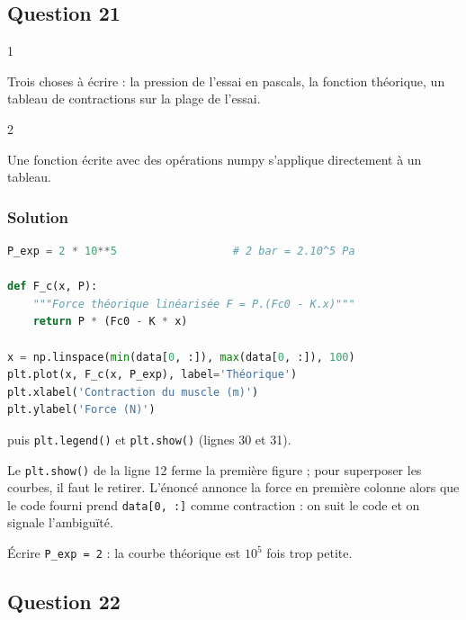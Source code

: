 \documentclass[11pt,a4paper]{article}
\begin{document}
\hypertarget{question-21}{%
\subsection{Question 21}\label{question-21}}

\begin{indication}{1}

Trois choses à écrire : la pression de l'essai en pascals, la fonction théorique, un tableau de contractions sur la plage de l'essai.

\end{indication}

\begin{indication}{2}

Une fonction écrite avec des opérations numpy s'applique directement à un tableau.

\end{indication}

\hypertarget{solution-20}{%
\subsubsection{Solution}\label{solution-20}}

\begin{lstlisting}[language=Python]
P_exp = 2 * 10**5                  # 2 bar = 2.10^5 Pa

def F_c(x, P):
    """Force théorique linéarisée F = P.(Fc0 - K.x)"""
    return P * (Fc0 - K * x)

x = np.linspace(min(data[0, :]), max(data[0, :]), 100)
plt.plot(x, F_c(x, P_exp), label='Théorique')
plt.xlabel('Contraction du muscle (m)')
plt.ylabel('Force (N)')
\end{lstlisting}

puis \texttt{plt.legend()} et \texttt{plt.show()} (lignes 30 et 31).

Le \texttt{plt.show()} de la ligne 12 ferme la première figure ; pour superposer les courbes, il faut le retirer. L'énoncé annonce la force en première colonne alors que le code fourni prend \texttt{data{[}0,\ :{]}} comme contraction : on suit le code et on signale l'ambiguïté.

\begin{piege}

Écrire \texttt{P\_exp\ =\ 2} : la courbe théorique est \(10^5\) fois trop petite.

\end{piege}

\hypertarget{question-22}{%
\subsection{Question 22}\label{question-22}}
\end{document}
